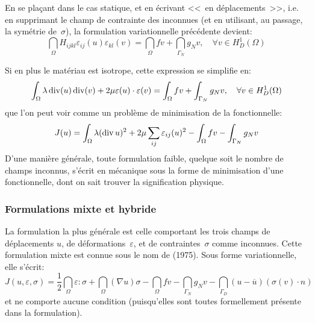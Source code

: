 En se plaçant dans le cas statique, et en écrivant <<~en déplacements~>>, i.e.
en supprimant le champ de contrainte des inconnues (et en utilisant, au passage,
la symétrie de~$\sigma$), la formulation variationnelle précédente devient:
\begin{equation}
\dint_\Omega H_{ijkl}\varepsilon_{ij}(u)\varepsilon_{kl}(v) = \dint_\Omega fv +
\dint_{\Gamma_N} g_N v, \quad \forall v\in H^1_D(\Omega)
\end{equation}

\medskip
Si en plus le matériau est isotrope, cette expression se simplifie en:
\begin{equation}
\displaystyle\int_\Omega \lambda \operatorname{div}(u)\operatorname{div}(v)+2\mu\varepsilon(u)\cdot\varepsilon(v) = \displaystyle\int_\Omega fv +
\displaystyle\int_{\Gamma_N} g_N v, \quad \forall v\in H^1_D(\Omega)
\end{equation}
que l'on peut voir comme un problème de minimisation de la fonctionnelle:
\begin{equation}
J(u)=
\displaystyle\int_\Omega \lambda (\operatorname{div} u)^2+2\mu\displaystyle\sum_{ij}\varepsilon_{ij}(u)^2 - \displaystyle\int_\Omega fv -
\displaystyle\int_{\Gamma_N} g_N v
\end{equation}
\medskip
D'une manière générale, toute formulation faible, quelque soit le nombre
de champs inconnus, s'écrit en mécanique sous la forme de minimisation d'une
fonctionnelle, dont on sait trouver la signification physique.

\medskip
\subsubsection{Formulations mixte et hybride}\label{Sec-MH}
La formulation la plus générale est celle comportant les trois champs de déplacements
$u$, de déformations~$\varepsilon$, et de contraintes~$\sigma$ comme inconnues.
Cette formulation mixte est connue sous le nom de  (1975).
Sous forme variationnelle, elle s'écrit:
\begin{equation}
J(u,\varepsilon,\sigma) =
\frac12 \dint_\Omega \varepsilon:\sigma
+\dint_\Omega (\nabla u) \sigma
- \dint_\Omega f v
- \dint_{\Gamma_N} g_N v
- \dint_{\Gamma_D} (u-\overline{u}) (\sigma(v)\cdot n)
\end{equation}
et ne comporte aucune condition (puisqu'elles sont toutes formellement présente dans
la formulation).

